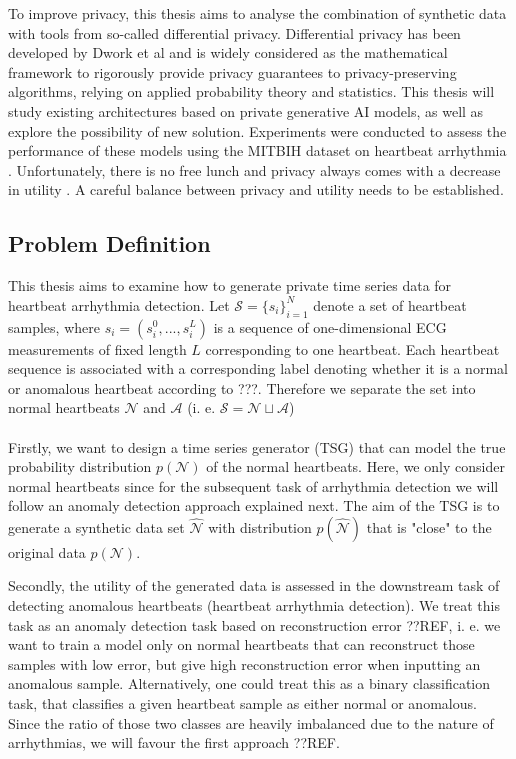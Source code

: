 To improve privacy, this thesis aims to analyse the combination of synthetic data with tools from so-called differential privacy. Differential privacy has been developed by Dwork et al \cite{10.1145/1866739.1866758} and is widely considered as the mathematical framework to rigorously provide privacy guarantees to privacy-preserving algorithms, relying on applied probability theory and statistics. This thesis will study existing architectures based on private generative AI models, as well as explore the possibility of new solution. Experiments were conducted to assess the performance of these models using the MITBIH dataset on heartbeat arrhythmia \parencite[][]{moody2001impact}. Unfortunately, there is no free lunch and privacy always comes with a decrease in utility \cite{stadler2022synthetic}. A careful balance between privacy and utility needs to be established.

\subsection{Problem Definition}

This thesis aims to examine how to generate private time series data for heartbeat arrhythmia detection. Let $\mathcal{S}=\{s_i\}_{i=1}^N$ denote a set of heartbeat samples, where $s_i=(s_i^0,..., s_i^L)$ is a sequence of one-dimensional ECG measurements of fixed length $L$ corresponding to one heartbeat. Each heartbeat sequence is associated with a corresponding label denoting whether it is a normal or anomalous heartbeat according to ???. Therefore we separate the set into normal heartbeats $\mathcal{N}$ and $\mathcal{A}$ (i. e. $\mathcal{S} = \mathcal{N} \sqcup \mathcal{A}$)

\paragraph{}

Firstly, we want to design a time series generator (TSG) that can model the true probability distribution $p(\mathcal{N})$ of the normal heartbeats. Here, we only consider normal heartbeats since for the subsequent task of arrhythmia detection we will follow an anomaly detection approach explained next. The aim of the TSG is to generate a synthetic data set $\widehat{\mathcal{N}}$ with distribution $p(\widehat{\mathcal{N}})$ that is "close" to the original data $p(\mathcal{N})$.

Secondly, the utility of the generated data is assessed in the downstream task of detecting anomalous heartbeats (heartbeat arrhythmia detection). We treat this task as an anomaly detection task based on reconstruction error ??REF, i. e. we want to train a model only on normal heartbeats that can reconstruct those samples with low error, but give high reconstruction error when inputting an anomalous sample. Alternatively, one could treat this as a binary classification task, that classifies a given heartbeat sample as either normal or anomalous. Since the ratio of those two classes are heavily imbalanced due to the nature of arrhythmias, we will favour the first approach ??REF.

